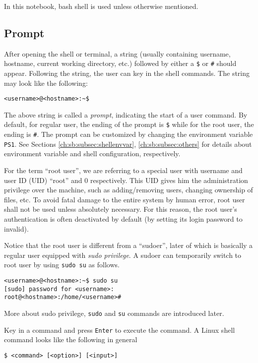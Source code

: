 In this notebook, bash shell is used unless otherwise mentioned.

\subsection{Prompt}

After opening the shell or terminal, a string (usually containing username, hostname, current working directory, etc.) followed by either a \verb|$| or \verb|#| should appear. Following the string, the user can key in the shell commands. The string may look like the following:
\begin{lstlisting}
<username>@<hostname>:~$
\end{lstlisting}

The above string is called a \textit{prompt}, indicating the start of a user command. By default, for regular user, the ending of the prompt is \verb|$| while for the root user, the ending is \verb|#|. The prompt can be customized by changing the environment variable \verb|PS1|. See Sections \ref{ch:sb:subsec:shellenvvar}, \ref{ch:sb:subsec:others} for details about environment variable and shell configuration, respectively.

For the term ``root user'', we are referring to a special user with username and user ID (UID) ``root'' and 0 respectively. This UID gives him the administration privilege over the machine, such as adding/removing users, changing ownership of files, etc. To avoid fatal damage to the entire system by human error, root user shall not be used unless absolutely necessary. For this reason, the root user's authentication is often deactivated by default (by setting its login password to invalid).

Notice that the root user is different from a ``sudoer'', later of which is basically a regular user equipped with \textit{sudo privilege}. A sudoer can temporarily switch to root user by using \verb|sudo su| as follows.
\begin{lstlisting}
<username>@<hostname>:~$ sudo su
[sudo] password for <username>:
root@<hostname>:/home/<username>#
\end{lstlisting}
More about sudo privilege, \verb|sudo| and \verb|su| commands are introduced later.

Key in a command and press \verb|Enter| to execute the command. A Linux shell command looks like the following in general
\begin{lstlisting}
$ <command> [<option>] [<input>]
\end{lstlisting}

